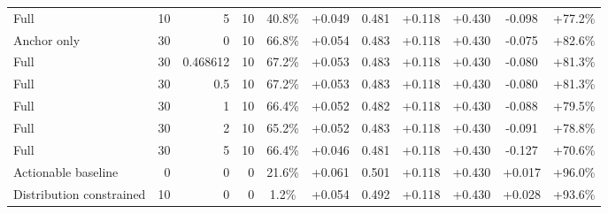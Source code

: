 \begin{table}[htbp]
\begin{tabular}{lrrrccccccc}
Full & 10 & 5 & 10 & 40.8\% & +0.049 & 0.481 & +0.118 & +0.430 & -0.098 & +77.2\% \\
Anchor only & 30 & 0 & 10 & 66.8\% & +0.054 & 0.483 & +0.118 & +0.430 & -0.075 & +82.6\% \\
Full & 30 & 0.468612 & 10 & 67.2\% & +0.053 & 0.483 & +0.118 & +0.430 & -0.080 & +81.3\% \\
Full & 30 & 0.5 & 10 & 67.2\% & +0.053 & 0.483 & +0.118 & +0.430 & -0.080 & +81.3\% \\
Full & 30 & 1 & 10 & 66.4\% & +0.052 & 0.482 & +0.118 & +0.430 & -0.088 & +79.5\% \\
Full & 30 & 2 & 10 & 65.2\% & +0.052 & 0.483 & +0.118 & +0.430 & -0.091 & +78.8\% \\
Full & 30 & 5 & 10 & 66.4\% & +0.046 & 0.481 & +0.118 & +0.430 & -0.127 & +70.6\% \\
Actionable baseline & 0 & 0 & 0 & 21.6\% & +0.061 & 0.501 & +0.118 & +0.430 & +0.017 & +96.0\% \\
Distribution constrained & 10 & 0 & 0 & 1.2\% & +0.054 & 0.492 & +0.118 & +0.430 & +0.028 & +93.6\% \\
\bottomrule
\end{tabular}
\end{table}
